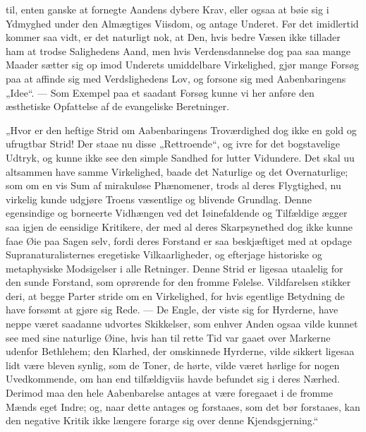 \documentclass[12pt,a4paper]{book}
\begin{document}
til, enten ganske at fornegte Aandens dybere Krav, eller ogsaa at bøie sig i Ydmyghed
under den Almægtiges Viisdom, og antage Underet. Før det imidlertid kommer saa vidt, er
det naturligt nok, at Den, hvis bedre Væsen ikke tillader ham at trodse Salighedens
Aand, men hvis Verdensdannelse dog paa saa mange Maader sætter sig op imod Underets
umiddelbare Virkelighed, gjør mange Forsøg paa at affinde sig med Verdslighedens Lov, og
forsone sig med Aabenbaringens „Idee“. --- Som Exempel paa et saadant Forsøg kunne vi her
anføre den æsthetiske Opfattelse af de evangeliske Beretninger.

„Hvor er den heftige Strid om Aabenbaringens Troværdighed dog ikke en gold og ufrugtbar
Strid! Der staae nu disse „Rettroende“, og ivre for det bogstavelige Udtryk, og kunne
ikke see den simple Sandhed for lutter Vidundere. Det skal uu altsammen have samme
Virkelighed, baade det Naturlige og det Overnaturlige; som om en vis Sum af mirakuløse
Phænomener, trods al deres Flygtighed, nu virkelig kunde udgjøre Troens væsentlige og
blivende Grundlag. Denne egensindige og borneerte Vidhængen ved det Iøinefaldende og
Tilfældige ægger saa igjen de eensidige Kritikere, der med al deres Skarpsynethed dog
ikke kunne faae Øie paa Sagen selv, fordi deres Forstand er saa beskjæftiget med at
opdage Supranaturalisternes eregetiske Vilkaarligheder, og
efterjage historiske og metaphysiske Modsigelser i alle Retninger. Denne Strid er
ligesaa utaalelig for den sunde Forstand, som oprørende for den fromme Følelse.
Vildfarelsen stikker deri, at begge Parter stride om en Virkelighed, for hvis egentlige
Betydning de have forsømt at gjøre sig Rede. --- De Engle, der viste sig for Hyrderne,
have neppe været saadanne udvortes Skikkelser, som enhver Anden ogsaa vilde kunnet see
med sine naturlige Øine, hvis han til rette Tid var gaaet over Markerne udenfor
Bethlehem; den Klarhed, der omskinnede Hyrderne, vilde sikkert ligesaa lidt være bleven
synlig, som de Toner, de hørte, vilde været hørlige for nogen Uvedkommende, om han end
tilfældigviis havde befundet sig i deres Nærhed. Derimod maa den hele Aabenbarelse
antages at være foregaaet i de fromme Mænds eget Indre; og, naar dette antages og
forstaaes, som det bør forstaaes, kan den negative Kritik ikke længere forarge sig over
denne Kjendsgjerning.“
\end{document}
